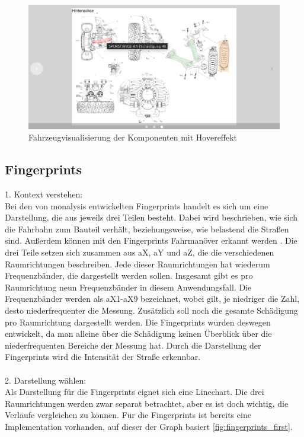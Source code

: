 \begin{figure}[h!]
\centering
\includegraphics[width=.8\textwidth]{gfx/vehicle_visualisation_detail.png}
\caption{Fahrzeugvisualisierung der Komponenten mit Hovereffekt}
\label{fig:vehicle_visualization_detail}
\end{figure}
\subsection{Fingerprints}
1. Kontext verstehen:\\
Bei den von monalysis entwickelten Fingerprints \cite{MichaelStadele.2008} handelt es sich um eine Darstellung, die aus jeweils drei Teilen besteht. Dabei wird beschrieben, wie sich die Fahrbahn zum Bauteil verhält, beziehungsweise, wie belastend die Straßen sind. Außerdem können mit den Fingerprints Fahrmanöver erkannt werden \cite{MichaelStadele.2008}. Die drei Teile setzen sich zusammen aus aX, aY und aZ, die die verschiedenen Raumrichtungen beschreiben. Jede dieser Raumrichtungen hat wiederum Frequenzbänder, die dargestellt werden sollen. Insgesamt gibt es pro Raumrichtung neun Frequenzbänder in diesem Anwendungsfall. Die Frequenzbänder werden als aX1-aX9 bezeichnet, wobei gilt, je niedriger die Zahl, desto niederfrequenter die Messung. Zusätzlich soll noch die gesamte Schädigung pro Raumrichtung dargestellt werden. Die Fingerprints wurden deswegen entwickelt, da man alleine über die Schädigung keinen Überblick über die niederfrequenten Bereiche der Messung hat. Durch die Darstellung der Fingerprints wird die Intensität der Straße erkennbar.\\\\
2. Darstellung wählen:\\
Als Darstellung für die Fingerprints eignet sich eine Linechart. Die drei Raumrichtungen werden zwar separat betrachtet, aber es ist doch wichtig, die Verläufe vergleichen zu können. Für die Fingerprints ist bereits eine Implementation vorhanden, auf dieser der Graph basiert \ref{fig:fingerprints_first}.
